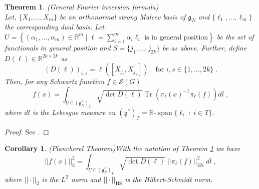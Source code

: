 \documentclass[pdflatex,sn-mathphys-num]{sn-jnl}
\theoremstyle{thmstyletwo}
\theoremstyle{thmstyleone}
\newtheorem{theorem}[definition]{Theorem}
\newtheorem{corollary}[definition]{Corollary}
\theoremstyle{thmstyletwo}
\newcommand{\fancyg}{\mathfrak{g}}
\begin{document}
		\begin{theorem}{(General Fourier inversion formula)}\label{thm: fourier inversion}\\
			Let, $\{X_1, \ldots, X_m\}$ be an orthonormal strong Malcev basis of $\fancyg_N$ and $\{\ell_1, \ldots, \ell_{m}\}$ the corresponding dual basis. Let $U = \left\{(\alpha_{1}, \ldots, \alpha_{m}) \in \mathbb{R}^{m} \; | \; \ell = \sum_{i=1}^{m}\alpha_i \ell_i \text{ is in general position} \right\}$ be the set of functionals in general position and $S= \{j_1, \ldots, j_{2k}\}$ be as above. Further, define $D(\ell) \in \mathbb{R}^{2k \times 2k}$ as
			$$(D(\ell))_{i,s} = \ell([X_{j_i},X_{j_s}]) \quad \text{for } i,s \in \{1, \ldots, 2k\} \;.$$
			Then, for any Schwartz function $f \in \mathcal{S}(G)$
			\[f(x) = \int_{U\cap (\fancyg_N^*)_T}\sqrt{\operatorname{det}D(\ell)}\operatorname{Tr}\left( \pi_{\ell}(x)^{-1}\pi_{\ell}(f)\right)dl \;,\]
			where $dl$ is the Lebesgue measure on $(\fancyg^*)_T = \mathbb{R}$-$\operatorname{span}\{\ell_i \;:\; i \in T\}$.
		\end{theorem}
		\begin{proof}
			See \cite[Theorem~4.3.9]{corwin1990representations}.
		\end{proof}
		\begin{corollary}{(Plancherel Theorem)}\label{cor: plancherel formula}
			With the notation of Theorem \ref{thm: fourier inversion} we have
			\[||f(x)||_2^2 = \int_{U\cap (\fancyg_N^*)_T}\sqrt{\operatorname{det}D(\ell)}\; ||\pi_{\ell}(f)||_{\text{HS}}^2 \;dl \;,\]
			where $|| \cdot||_2$ is the $L^2$ norm and $||\cdot||_{\text{HS}}$ is the Hilbert-Schmidt norm.
		\end{corollary}
		
\end{document}
